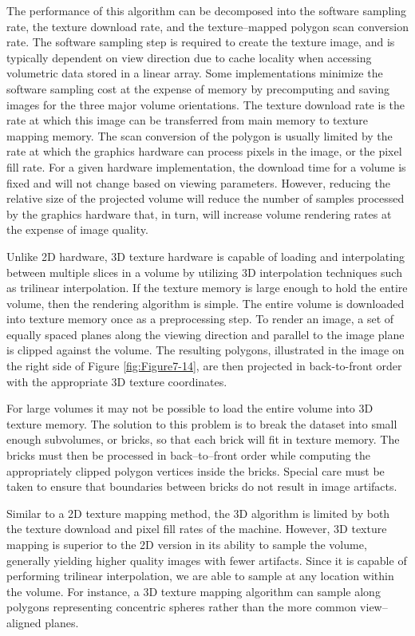 The performance of this algorithm can be decomposed into the software sampling rate, the texture download rate, and the texture--mapped polygon scan conversion rate. The software sampling step is required to create the texture image, and is typically dependent on view direction due to cache locality when accessing volumetric data stored in a linear array. Some implementations minimize the software sampling cost at the expense of memory by precomputing and saving images for the three major volume orientations. The texture download rate is the rate at which this image can be transferred from main memory to texture mapping memory. The scan conversion of the polygon is usually limited by the rate at which the graphics hardware can process pixels in the image, or the pixel fill rate. For a given hardware implementation, the download time for a volume is fixed and will not change based on viewing parameters. However, reducing the relative size of the projected volume will reduce the number of samples processed by the graphics hardware that, in turn, will increase volume rendering rates at the expense of image quality.

Unlike 2D hardware, 3D texture hardware is capable of loading and interpolating between multiple slices in a volume by utilizing 3D interpolation techniques such as trilinear interpolation. If the texture memory is large enough to hold the entire volume, then the rendering algorithm is simple. The entire volume is downloaded into texture memory once as a preprocessing step. To render an image, a set of equally spaced planes along the viewing direction and parallel to the image plane is clipped against the volume. The resulting polygons, illustrated in the image on the right side of Figure \ref{fig:Figure7-14}, are then projected in back-to-front order with the appropriate 3D texture coordinates.

For large volumes it may not be possible to load the entire volume into 3D texture memory. The solution to this problem is to break the dataset into small enough subvolumes, or bricks, so that each brick will fit in texture memory. The bricks must then be processed in back--to--front order while computing the appropriately clipped polygon vertices inside the bricks. Special care must be taken to ensure that boundaries between bricks do not result in image artifacts.

Similar to a 2D texture mapping method, the 3D algorithm is limited by both the texture download and pixel fill rates of the machine. However, 3D texture mapping is superior to the 2D version in its ability to sample the volume, generally yielding higher quality images with fewer artifacts. Since it is capable of performing trilinear interpolation, we are able to sample at any location within the volume. For instance, a 3D texture mapping algorithm can sample along polygons representing concentric spheres rather than the more common view--aligned planes.

